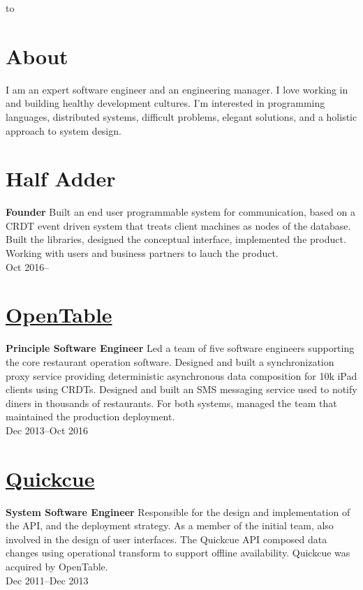 \documentclass[margin]{res}
\begin{document}

\hbox to 

\begin{resume}
\section{About}

I am an expert software engineer and an engineering manager. I love
working in and building healthy development cultures. I'm interested
in programming languages, distributed systems, difficult problems,
elegant solutions, and a holistic approach to system design.

\section{Half Adder}
{\bf Founder}
%
Built an end user programmable system for communication, based on a
CRDT event driven system that treats client machines as nodes of the
database. Built the libraries, designed the conceptual interface,
implemented the product. Working with users and business partners to
lauch the product.\\
%
Oct 2016--

\section{\href{https://opentable.com/}{OpenTable}}
{\bf Principle Software Engineer}
%
Led a team of five software engineers supporting the core restaurant
operation software. Designed and built a synchronization proxy service
providing deterministic asynchronous data composition for 10k iPad
clients using CRDTs. Designed and built an SMS messaging service used
to notify diners in thousands of restaurants. For both systems,
managed the team that maintained the production deployment.\\
%
Dec 2013--Oct 2016

\section{\href{https://quickcue.com/}{Quickcue}}
{\bf System Software Engineer}
%
Responsible for the design and implementation of the API, and the
deployment strategy. As a member of the initial team, also involved in
the design of user interfaces. The Quickcue API composed data changes
using operational transform to support offline availability. Quickcue
was acquired by OpenTable.\\
%
Dec 2011--Dec 2013


\end{resume}
\end{document}
